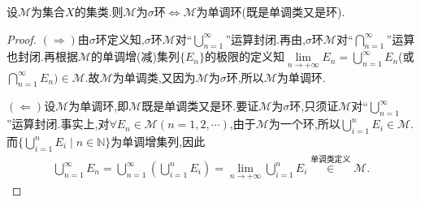 \documentclass[../../main.tex]{subfiles}%
\begin{document}
\begin{theorem}\label{theorem:集合论--定理1.3.8}
设$\mathscr{M}$为集合$X$的集类.则$\mathscr{M}$为$\sigma$环$\iff  \mathscr{M}$为单调环(既是单调类又是环).
\end{theorem}
\begin{proof}
$(\Rightarrow)$由$\sigma$环定义知,$\sigma$环$\mathscr{M}$对“$\bigcup_{n=1}^{\infty}$”运算封闭.再由,$\sigma$环$\mathscr{M}$对“$\bigcap_{n=1}^{\infty}$”运算也封闭.再根据$\mathscr{M}$的单调增(减)集列$\{E_n\}$的极限的定义知$\lim\limits_{n \to +\infty} E_n = \bigcup_{n=1}^{\infty} E_n$(或$\bigcap_{n=1}^{\infty} E_n) \in \mathscr{M}$.故$\mathscr{M}$为单调类,又因为$\mathscr{M}$为$\sigma$环,所以$\mathscr{M}$为单调环.

$(\Leftarrow)$设$\mathscr{M}$为单调环,即$\mathscr{M}$既是单调类又是环.要证$\mathscr{M}$为$\sigma$环,只须证$\mathscr{M}$对“$\bigcup_{n=1}^{\infty}$”运算封闭.事实上,对$\forall E_n \in \mathscr{M}(n=1,2,\cdots)$,由于$\mathscr{M}$为一个环,所以$\bigcup_{i=1}^{n} E_i \in \mathscr{M}$.而$\{\bigcup_{i=1}^{n} E_i \mid n \in \mathbb{N}\}$为单调增集列,因此
\begin{align*}
\bigcup_{n=1}^{\infty} E_n = \bigcup_{n=1}^{\infty} \left( \bigcup_{i=1}^{n} E_i \right) = \lim\limits_{n \to +\infty} \bigcup_{i=1}^{n} E_i \stackrel{\text{单调类定义}}{\in} \mathscr{M}.
\end{align*}
\end{proof}
\end{document}

